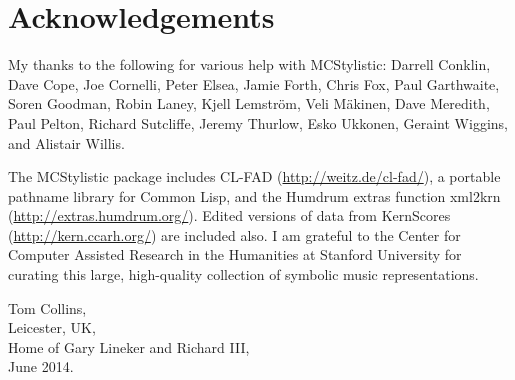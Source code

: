 \chapter*{Acknowledgements}

My thanks to the following for various help with MCStylistic: Darrell Conklin, Dave Cope, Joe Cornelli, Peter Elsea, Jamie Forth, Chris Fox, Paul Garthwaite, Soren Goodman, Robin Laney, Kjell Lemstr\"om, Veli M\"akinen, Dave Meredith, Paul Pelton, Richard Sutcliffe, Jeremy Thurlow, Esko Ukkonen, Geraint Wiggins, and Alistair Willis.

The MCStylistic package includes CL-FAD (\href{http://weitz.de/cl-fad/}{http://weitz.de/cl-fad/}), a portable pathname library for Common Lisp, and the Humdrum extras function xml2krn (\href{http://extras.humdrum.org/}{http://extras.humdrum.org/}). Edited versions of data from KernScores (\href{http://kern.ccarh.org/}{http://kern.ccarh.org/}) are included also. I am grateful to the Center for Computer Assisted Research in the Humanities at Stanford University for curating this large, high-quality collection of symbolic music representations.

\begin{flushright}
Tom Collins,\\
Leicester, UK,\\
Home of Gary Lineker and Richard III,\\
June 2014.
\end{flushright}


